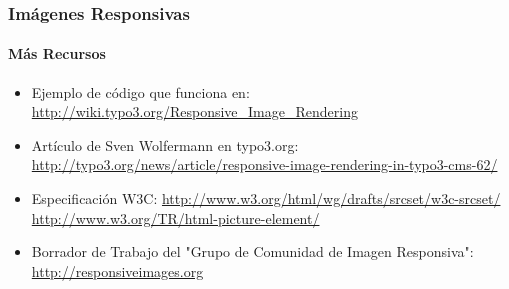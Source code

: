 
\begin{frame}[fragile]
	\frametitle{Imágenes Responsivas}
	\framesubtitle{Más Recursos}

	\begin{itemize}
		\item Ejemplo de código que funciona en:\newline
			\small\url{http://wiki.typo3.org/Responsive_Image_Rendering}\normalsize

		\item Artículo de Sven Wolfermann en typo3.org:\newline
			\small\url{http://typo3.org/news/article/responsive-image-rendering-in-typo3-cms-62/}\normalsize

		\item Especificación W3C:\newline
			\small\url{http://www.w3.org/html/wg/drafts/srcset/w3c-srcset/}\newline
			\small\url{http://www.w3.org/TR/html-picture-element/}

		\item Borrador de Trabajo del "Grupo de Comunidad de Imagen Responsiva":\newline
			\small\url{http://responsiveimages.org}\normalsize

	\end{itemize}

\end{frame}


